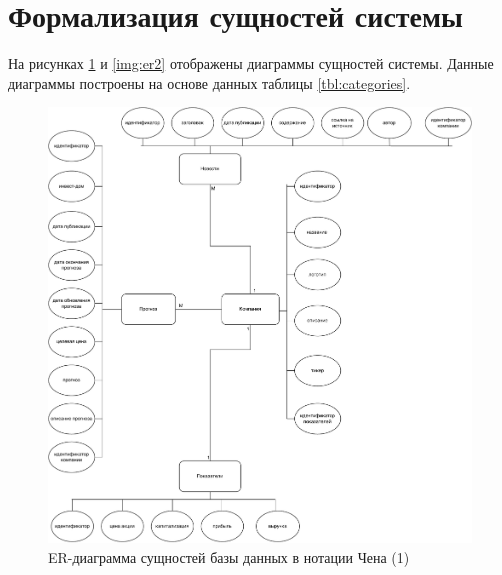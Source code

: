 \section{Формализация сущностей системы}
На рисунках \ref*{img:er1} и \ref*{img:er2} отображены диаграммы сущностей системы. Данные диаграммы построены на основе данных таблицы \ref*{tbl:categories}.
\begin{figure}[h!]
	\begin{center}
		\includegraphics[scale=0.6]{img/er.pdf}
	\end{center}
	\captionsetup{justification=centering}
	\caption{ER-диаграмма сущностей базы данных в нотации Чена (1)}
	\label{img:er1}
\end{figure}
\newpage


